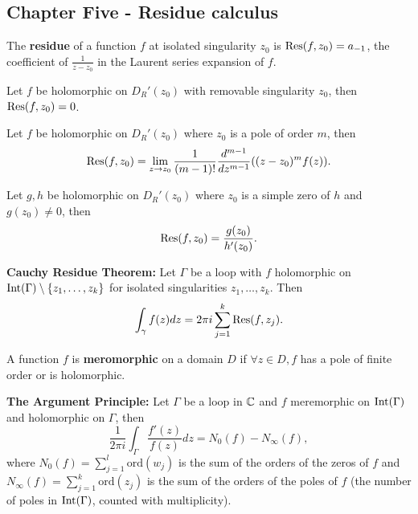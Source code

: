 \newpage%
\begin{multicols}{2}
\section*{Chapter Five - Residue calculus}

\begin{definition}
The \textbf{residue} of a function $f$ at isolated singularity $z_0$ is $\mathrm{Res}(f,z_0)=a_{-1}$, the coefficient of $\frac{1}{z-z_0}$ in the Laurent series expansion of $f$.
\end{definition}

\begin{theorem}[5.1.4]
Let $f$ be holomorphic on $D_R'(z_0)$ with removable singularity $z_0$, then $\mathrm{Res}(f,z_0)=0$.
\end{theorem}

\begin{theorem}[5.1.5]
Let $f$ be holomorphic on $D_R'(z_0)$ where $z_0$ is a pole of order $m$, then
    \[
    \mathrm{Res}(f,z_0) = 
    \lim_{z\to z_0} \frac{1}{(m-1)!}\frac{d^{m-1}}{dz^{m-1}}((z-z_0)^mf(z)).
    \]
\end{theorem}

\begin{theorem}[5.1.7]
Let $g,h$ be holomorphic on $D_R'(z_0)$ where $z_0$ is a simple zero of $h$ and $g(z_0)\neq0$, then
    \[
    \mathrm{Res}(f,z_0) = \frac{g(z_0)}{h'(z_0)}.
    \]
\end{theorem}

\begin{theorem}
\textbf{Cauchy Residue Theorem:} Let $\Gamma$ be a loop with $f$ holomorphic on $\mathrm{Int}(\Gamma)\setminus\{z_1,\dots,z_k\}$ for isolated singularities $z_1,\dots,z_k$. Then
    \[
    \int_\gamma f(z)dz = 2\pi i\sum_{j=1}^k \mathrm{Res}(f,z_j).
    \]
\end{theorem}

\begin{definition}
A function $f$ is \textbf{meromorphic} on a domain $D$ if $\forall z\in D, f$ has a pole of finite order or is holomorphic.
\end{definition}


\begin{theorem}
\textbf{The Argument Principle:} Let $\Gamma$ be a loop in $\mathbb{C}$ and $f$ meremorphic on $\mathrm{Int}(\Gamma)$ and holomorphic on $\Gamma$, then
    \[
    \frac{1}{2\pi i}\int_\Gamma\frac{f'(z)}{f(z)}dz = N_0(f) - N_\infty(f),
    \]
where $N_0(f)=\sum_{j=1}^l \mathrm{ord}(w_j)$ is the sum of the orders of the zeros of $f$ and $N_\infty(f)=\sum_{j=1}^k \mathrm{ord}(z_j)$ is the sum of the orders of the poles of $f$ (the number of poles in $\mathrm{Int}(\Gamma)$, counted with multiplicity).
\end{theorem}


\end{multicols}
